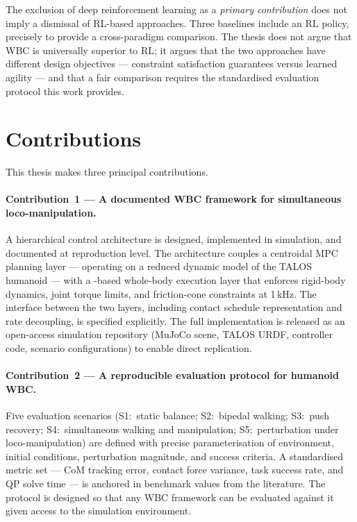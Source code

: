 The exclusion of deep reinforcement learning as a \emph{primary
contribution} does not imply a dismissal of RL-based approaches. Three
baselines include an RL policy, precisely to provide a cross-paradigm
comparison. The thesis does not argue that WBC is universally superior
to RL; it argues that the two approaches have different design
objectives — constraint satisfaction guarantees versus learned agility
— and that a fair comparison requires the standardised evaluation
protocol this work provides.


\section{Contributions}
\label{sec:contributions}

This thesis makes three principal contributions.

\paragraph{Contribution~1 — A documented WBC framework for simultaneous
loco-manipulation.}
A hierarchical control architecture is designed, implemented in
simulation, and documented at reproduction level. The architecture
couples a centroidal MPC planning layer — operating on a reduced dynamic
model of the TALOS humanoid — with a \QP{}-based whole-body execution
layer that enforces rigid-body dynamics, joint torque limits, and
friction-cone constraints at 1\,kHz. The interface between the two
layers, including contact schedule representation and rate decoupling,
is specified explicitly. The full implementation is released as an
open-access simulation repository (MuJoCo scene, TALOS URDF, controller
code, scenario configurations) to enable direct replication.

\paragraph{Contribution~2 — A reproducible evaluation protocol for
humanoid WBC.}
Five evaluation scenarios (S1:~static balance; S2:~bipedal walking;
S3:~push recovery; S4:~simultaneous walking and manipulation;
S5:~perturbation under loco-manipulation) are defined with precise
parameterisation of environment, initial conditions, perturbation
magnitude, and success criteria. A standardised metric set — CoM
tracking error, contact force variance, task success rate, and QP solve
time — is anchored in benchmark values from the literature. The
protocol is designed so that any WBC framework can be evaluated against
it given access to the simulation environment.

